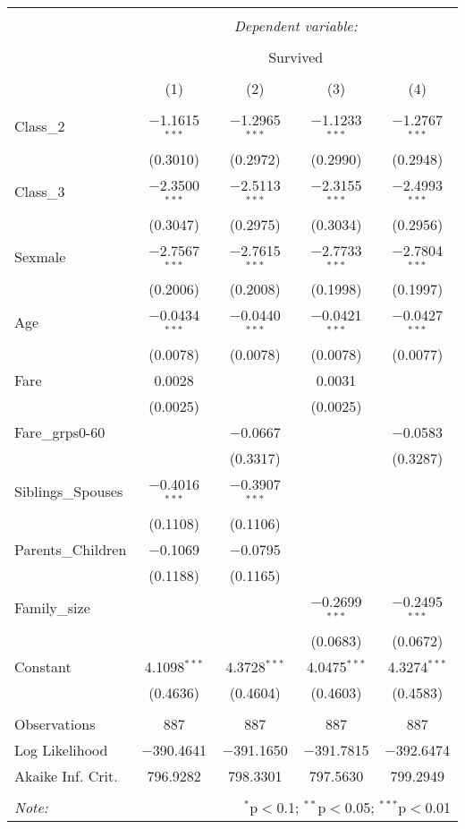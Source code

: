 \documentclass[
]{article}
\begin{document}
\begingroup 
\scriptsize 
\begin{tabular}{@{\extracolsep{5pt}}lcccc} 
\\[-1.8ex]\hline 
\hline \\[-1.8ex] 
 & \multicolumn{4}{c}{\textit{Dependent variable:}} \\ 
\cline{2-5} 
\\[-1.8ex] & \multicolumn{4}{c}{Survived} \\ 
\\[-1.8ex] & (1) & (2) & (3) & (4)\\ 
\hline \\[-1.8ex] 
 Class\_2 & $-$1.1615$^{***}$ & $-$1.2965$^{***}$ & $-$1.1233$^{***}$ & $-$1.2767$^{***}$ \\ 
  & (0.3010) & (0.2972) & (0.2990) & (0.2948) \\ 
  Class\_3 & $-$2.3500$^{***}$ & $-$2.5113$^{***}$ & $-$2.3155$^{***}$ & $-$2.4993$^{***}$ \\ 
  & (0.3047) & (0.2975) & (0.3034) & (0.2956) \\ 
  Sexmale & $-$2.7567$^{***}$ & $-$2.7615$^{***}$ & $-$2.7733$^{***}$ & $-$2.7804$^{***}$ \\ 
  & (0.2006) & (0.2008) & (0.1998) & (0.1997) \\ 
  Age & $-$0.0434$^{***}$ & $-$0.0440$^{***}$ & $-$0.0421$^{***}$ & $-$0.0427$^{***}$ \\ 
  & (0.0078) & (0.0078) & (0.0078) & (0.0077) \\ 
  Fare & 0.0028 &  & 0.0031 &  \\ 
  & (0.0025) &  & (0.0025) &  \\ 
  Fare\_grps0-60 &  & $-$0.0667 &  & $-$0.0583 \\ 
  &  & (0.3317) &  & (0.3287) \\ 
  Siblings\_Spouses & $-$0.4016$^{***}$ & $-$0.3907$^{***}$ &  &  \\ 
  & (0.1108) & (0.1106) &  &  \\ 
  Parents\_Children & $-$0.1069 & $-$0.0795 &  &  \\ 
  & (0.1188) & (0.1165) &  &  \\ 
  Family\_size &  &  & $-$0.2699$^{***}$ & $-$0.2495$^{***}$ \\ 
  &  &  & (0.0683) & (0.0672) \\ 
  Constant & 4.1098$^{***}$ & 4.3728$^{***}$ & 4.0475$^{***}$ & 4.3274$^{***}$ \\ 
  & (0.4636) & (0.4604) & (0.4603) & (0.4583) \\ 
 \hline \\[-1.8ex] 
Observations & 887 & 887 & 887 & 887 \\ 
Log Likelihood & $-$390.4641 & $-$391.1650 & $-$391.7815 & $-$392.6474 \\ 
Akaike Inf. Crit. & 796.9282 & 798.3301 & 797.5630 & 799.2949 \\ 
\hline 
\hline \\[-1.8ex] 
\textit{Note:}  & \multicolumn{4}{r}{$^{*}$p$<$0.1; $^{**}$p$<$0.05; $^{***}$p$<$0.01} \\ 
\end{tabular} 
\endgroup
\end{document}
